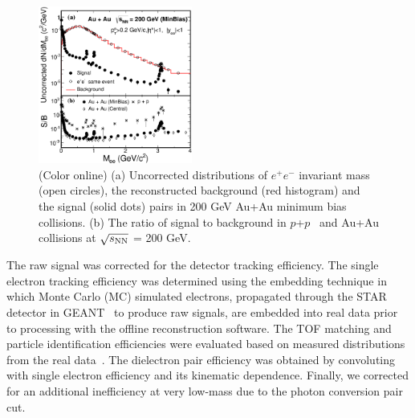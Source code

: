 \documentclass[twocolumn,showpacs,amsmath,amssymb,superscriptaddress,nofootinbib]{revtex4-1}
\newcommand{\sNN}{$\sqrt{s_{\rm NN}}$ }
\begin{document}
\begin{figure}[ht]
\centering
\includegraphics[width=0.45\textwidth]{paper_PRL.eps}
\caption[]{(Color online) (a) Uncorrected distributions of $e^+e^-$ invariant mass (open circles), the reconstructed background (red histogram) and the signal (solid dots) pairs in 200 GeV Au+Au minimum bias collisions. (b) The ratio of signal to background in $p$+$p$~\cite{STARpp} and Au+Au collisions at \sNN = 200 GeV.}
\label{bg1}
\end{figure}






The raw signal was corrected for the detector tracking efficiency.
The single electron tracking efficiency was determined using the embedding technique in which Monte Carlo (MC) simulated electrons, propagated through the STAR detector in GEANT~\cite{geant:321} to produce raw signals, are embedded into real data prior to processing with the offline reconstruction software.
The TOF matching and particle identification efficiencies were evaluated based on measured distributions from the real data~\cite{Efficiency}. The dielectron pair efficiency was obtained by convoluting with single electron efficiency and its kinematic dependence. Finally, we corrected for an additional inefficiency at very low-mass due to the photon conversion pair cut.
\end{document}
